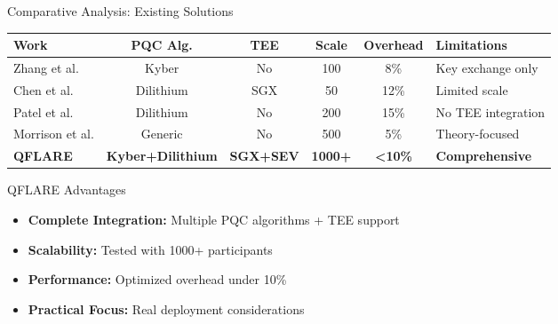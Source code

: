 \documentclass[aspectratio=169,11pt]{beamer}
\newcommand{\highlight}[1]{\textcolor{qflareblue}{\textbf{#1}}}
\begin{document}
\begin{frame}{Comparative Analysis: Existing Solutions}

\begin{table}[h]
\centering
\footnotesize
\begin{tabular}{@{}lccccl@{}}
\toprule
\textbf{Work} & \textbf{PQC Alg.} & \textbf{TEE} & \textbf{Scale} & \textbf{Overhead} & \textbf{Limitations} \\
\midrule
Zhang et al. & Kyber & No & 100 & 8\% & Key exchange only \\
Chen et al. & Dilithium & SGX & 50 & 12\% & Limited scale \\
Patel et al. & Dilithium & No & 200 & 15\% & No TEE integration \\
Morrison et al. & Generic & No & 500 & 5\% & Theory-focused \\
\midrule
\textbf{QFLARE} & \textbf{Kyber+Dilithium} & \textbf{SGX+SEV} & \textbf{1000+} & \textbf{<10\%} & \textbf{Comprehensive} \\
\bottomrule
\end{tabular}
\end{table}

\begin{block}{QFLARE Advantages}
\begin{itemize}
    \item \highlight{Complete Integration:} Multiple PQC algorithms + TEE support
    \item \highlight{Scalability:} Tested with 1000+ participants
    \item \highlight{Performance:} Optimized overhead under 10\%
    \item \highlight{Practical Focus:} Real deployment considerations
\end{itemize}
\end{block}

\end{frame}

\end{document}
